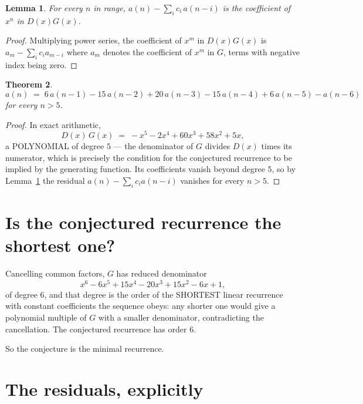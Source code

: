 \documentclass[11pt,a4paper]{article}
\theoremstyle{plain}
\newtheorem{theorem}{Theorem}
\newtheorem{lemma}[theorem]{Lemma}
\theoremstyle{definition}
\begin{document}
\begin{lemma}\label{lem:key}
For every $n$ in range, $a(n)-\sum_i c_i\,a(n-i)$ is the coefficient of $x^{n}$ in
$D(x)G(x)$.
\end{lemma}

\begin{proof}
Multiplying power series, the coefficient of $x^{m}$ in $D(x)G(x)$ is
$a_m-\sum_i c_i a_{m-i}$ where $a_m$ denotes the coefficient of $x^{m}$ in $G$, terms with
negative index being zero.
\end{proof}

\begin{theorem}
\[
a(n)\;=\;6\,a(n-1) - 15\,a(n-2) + 20\,a(n-3) - 15\,a(n-4) + 6\,a(n-5) - a(n-6)
\]
for every $n>5$.
\end{theorem}

\begin{proof}
In exact arithmetic,
\[
D(x)\,G(x)\;=\;- x^{5} - 2 x^{4} + 60 x^{3} + 58 x^{2} + 5 x,
\]
a POLYNOMIAL of degree $5$ --- the denominator of $G$ divides $D(x)$ times its numerator,
which is precisely the condition for the conjectured recurrence to be implied by the
generating function. Its coefficients vanish beyond degree $5$, so by
Lemma~\ref{lem:key} the residual $a(n)-\sum_ic_ia(n-i)$ vanishes for every
$n>5$.
\end{proof}

\section{Is the conjectured recurrence the shortest one?}

Cancelling common factors, $G$ has reduced denominator
\[
x^{6} - 6 x^{5} + 15 x^{4} - 20 x^{3} + 15 x^{2} - 6 x + 1,
\]
of degree $6$, and that degree is the order of the SHORTEST linear recurrence with
constant coefficients the sequence obeys: any shorter one would give a polynomial multiple of
$G$ with a smaller denominator, contradicting the cancellation. The conjectured recurrence has
order $6$.

So the conjecture is the minimal recurrence.

\section{The residuals, explicitly}
\end{document}
